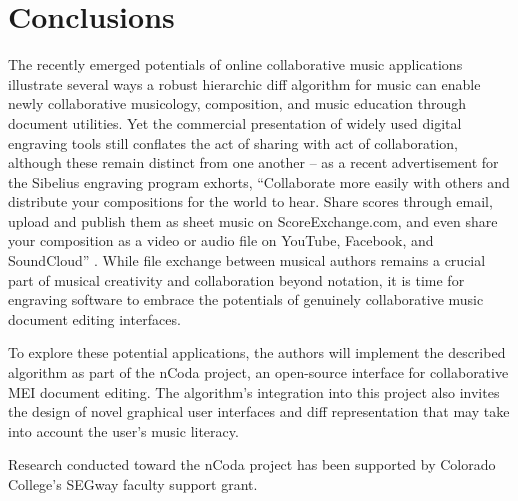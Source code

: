 \documentclass{article}
\begin{document}

\section{Conclusions}
The recently emerged potentials of online collaborative music applications illustrate several ways a robust hierarchic diff algorithm for music can enable newly collaborative musicology, composition, and music education through document utilities\cite{wust2001architectural,Martin:2015pb,McCulloch:2015pd,Flat:aa,Baca:2015xr}. Yet the commercial presentation of widely used digital engraving tools still conflates the act of sharing with act of collaboration, although these remain distinct from one another -- as a recent advertisement for the Sibelius engraving program exhorts, ``Collaborate more easily with others and distribute your compositions for the world to hear. Share scores through email, upload and publish them as sheet music on ScoreExchange.com, and even share your composition as a video or audio file on YouTube, Facebook, and SoundCloud'' \cite{Avid:to}. While file exchange between musical authors remains a crucial part of musical creativity and collaboration beyond notation, it is time for engraving software to embrace the potentials of genuinely collaborative music document editing interfaces. 

To explore these potential applications, the authors will implement the described algorithm as part of the nCoda project, an open-source interface for collaborative MEI document editing. The algorithm's integration into this project also invites the design of novel graphical user interfaces and diff representation that may take into account the user's music literacy.

%
\begin{acknowledgments}
Research conducted toward the nCoda project has been supported by Colorado College's SEGway faculty support grant.
\end{acknowledgments} 

\balance

\end{document}
